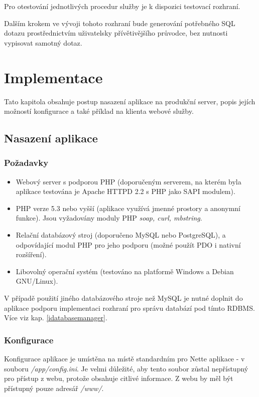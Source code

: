 \documentclass[11pt,twoside,a4paper]{book}
\begin{document}
Pro otestování jednotlivých procedur služby je k dispozici testovací rozhraní.

Dalším krokem ve vývoji tohoto rozhraní bude generování potřebného SQL dotazu prostřednictvím uživatelsky přívětivějšího průvodce, bez nutnosti vypisovat samotný dotaz.


\chapter{Implementace}
Tato kapitola obsahuje postup nasazení aplikace na produkční server, popis jejích možností konfigurace a také příklad na klienta webové služby.
 
\section{Nasazení aplikace}
\subsection{Požadavky}
\begin{itemize}
\item Webový server s podporou PHP (doporučeným serverem, na kterém byla aplikace testována je Apache HTTPD 2.2 s PHP jako SAPI modulem).
\item PHP verze 5.3 nebo vyšší (aplikace využívá jmenné prostory a anonymní funkce). Jsou vyžadovány moduly PHP \textit{soap, curl, mbstring}.
\item Relační databázový stroj (doporučeno MySQL nebo PostgreSQL), a odpovídající modul PHP pro jeho podporu (možné použít PDO i nativní rozšíření).
\item Libovolný operační systém (testováno na platformě Windows a Debian GNU/Linux).
\end{itemize}
V případě použití jiného databázového stroje než MySQL je nutné doplnit do aplikace podporu implementaci rozhraní pro správu databází pod tímto RDBMS. Více viz kap. \ref{idatabasemanager}.

\subsection{Konfigurace}
Konfigurace aplikace je umístěna na místě standardním pro Nette aplikace - v souboru \textit{/app/config.ini}. Je velmi důležité, aby tento soubor zůstal nepřístupný pro přístup z webu, protože obsahuje citlivé informace. Z webu by měl být přístupný pouze adresář \textit{/www/}.
\end{document}
